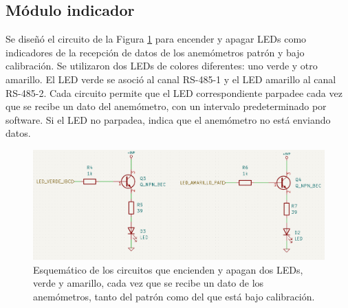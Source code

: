 \subsection{Módulo indicador}
Se diseñó el circuito de la Figura \ref{fig:esquemLedsSensor}  para encender y apagar LEDs como indicadores de la recepción de datos de los anemómetros patrón y bajo calibración. Se utilizaron dos LEDs de colores diferentes: uno verde y otro amarillo. El LED verde se asoció al canal RS-485-1 y el LED amarillo al canal RS-485-2. Cada circuito permite que el LED correspondiente parpadee cada vez que se recibe un dato del anemómetro, con un intervalo predeterminado por software. Si el LED no parpadea, indica que el anemómetro no está enviando datos.%


\begin{figure}[H]
    \centering
    \includegraphics[width=0.95\linewidth]{Figuras/datalogger/Hardware/esquemLedsSensor.png}
    \caption{Esquemático de los circuitos que encienden y apagan dos LEDs, verde y amarillo, cada vez que se recibe un dato de los anemómetros, tanto del patrón como del que está bajo calibración.}

    \label{fig:esquemLedsSensor}
\end{figure}

